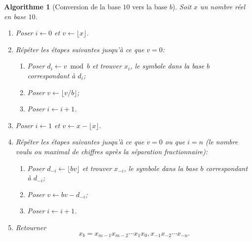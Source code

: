 \documentclass[letterpaper,11pt]{memoir}
\theoremstyle{plain}
\newtheorem{algorithme}{Algorithme}[chapter]
\theoremstyle{definition}
\theoremstyle{remark}
\begin{document}
\begin{algorithme}[Conversion de la base $10$ vers la base $b$]
  \label{algo:ordinateurs:10_vers_b}
  Soit $x$ un nombre réel en base $10$.
  \begin{enumerate}
  \item Poser $i \leftarrow 0$ et $v \leftarrow \lfloor x \rfloor$.
  \item Répéter les étapes suivantes jusqu'à ce que $v = 0$:
    \begin{enumerate}
    \item Poser $d_i \leftarrow v \bmod b$ et trouver $x_i$, le
      symbole dans la base $b$ correspondant à $d_i$;
    \item Poser $v \leftarrow \lfloor v/b \rfloor$;
    \item Poser $i \leftarrow i + 1$.
    \end{enumerate}
  \item Poser $i \leftarrow 1$ et $v \leftarrow x - \lfloor x
    \rfloor$.
  \item Répéter les étapes suivantes jusqu'à ce que $v = 0$ ou que $i
    = n$ (le nombre voulu ou maximal de chiffres après la séparation
    fractionnaire):
    \begin{enumerate}
    \item Poser $d_{-i} \leftarrow \lfloor bv \rfloor$ et trouver $x_{-i}$, le
      symbole dans la base $b$ correspondant à $d_{-i}$;
    \item Poser $v \leftarrow bv - d_{-i}$;
    \item Poser $i \leftarrow i + 1$.
    \end{enumerate}
  \item Retourner
    \begin{displaymath}
      x_b = x_{m-1}x_{m-2} \cdots x_1x_0,x_{-1}x_{-2} \cdots x_{-n}.
    \end{displaymath}
  \end{enumerate}
\end{algorithme}
\end{document}
